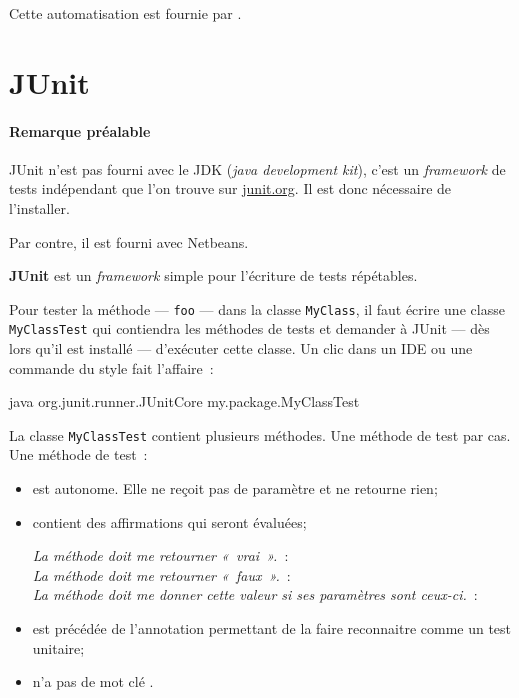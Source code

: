 Cette automatisation est fournie par .

\section{JUnit}

\paragraph{Remarque préalable} JUnit n'est pas fourni avec le JDK (\textit{java
development kit}), c'est un \textit{framework} de tests indépendant que l'on
trouve sur \url{junit.org}. Il est donc nécessaire de l'installer. 

Par contre, il est fourni avec Netbeans. 

\textbf{JUnit} est un \textit{framework} simple pour l'écriture de tests
répétables. 

Pour tester la méthode — \texttt{foo} — dans la classe \texttt{MyClass}, il faut
écrire une classe \texttt{MyClassTest} qui contiendra les méthodes de tests et
demander à JUnit — dès lors qu'il est installé — d'exécuter cette classe. Un clic dans un IDE ou une commande du style fait l'affaire~:

\begin{term}
	java org.junit.runner.JUnitCore my.package.MyClassTest
\end{term}

La classe \texttt{MyClassTest} contient plusieurs méthodes. Une méthode de test
par cas. Une méthode de test~: 

\begin{itemize}
	\item est autonome. Elle ne reçoit pas de paramètre et ne retourne rien;
	
	\item contient des affirmations qui seront évaluées;

		\textit{La méthode doit me retourner «~vrai~».}~: \\
		\textit{La méthode doit me retourner «~faux~».}~: \\
		\textit{La méthode doit me donner cette valeur si ses paramètres sont
		ceux-ci.}~:\\

	\item est précédée de l'annotation  permettant de la faire
		reconnaitre comme un test unitaire;

	\item n'a pas de mot clé .

\end{itemize}

